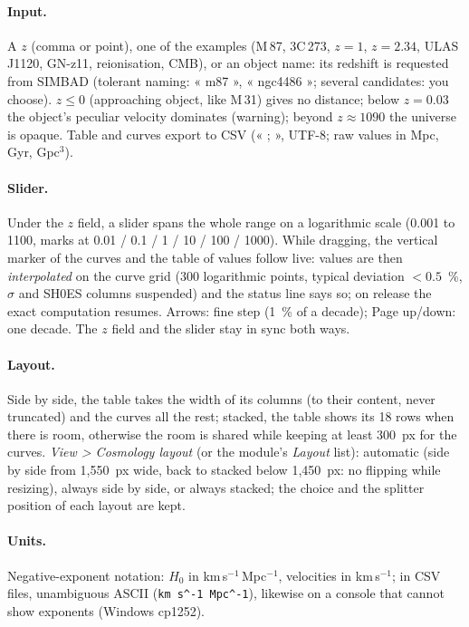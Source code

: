 \paragraph{Input.} A $z$ (comma or point), one of the examples (M\,87, 3C\,273, $z = 1$, $z = 2.34$, ULAS J1120,
GN-z11, reionisation, CMB), or an object name: its redshift is requested from SIMBAD (tolerant naming: « m87 »,
« ngc4486 »; several candidates: you choose). $z \le 0$ (approaching object, like M\,31) gives no distance; below
$z = 0.03$ the object's peculiar velocity dominates (warning); beyond $z \approx 1090$ the universe is opaque. Table
and curves export to CSV (« ; », UTF-8; raw values in Mpc, Gyr, Gpc$^3$).

\paragraph{Slider.} Under the $z$ field, a slider spans the whole range on a logarithmic scale (0.001 to 1100,
marks at 0.01 / 0.1 / 1 / 10 / 100 / 1000). While dragging, the vertical marker of the curves and the table of values
follow live: values are then \emph{interpolated} on the curve grid (300 logarithmic points, typical deviation
$< 0.5$~\%, $\sigma$ and SH0ES columns suspended) and the status line says so; on release the exact computation
resumes. Arrows: fine step (1~\% of a decade); Page up/down: one decade. The $z$ field and the slider stay in sync
both ways.

\paragraph{Layout.} Side by side, the table takes the width of its columns (to their content, never truncated) and
the curves all the rest; stacked, the table shows its 18 rows when there is room, otherwise the room is shared while
keeping at least 300~px for the curves. \emph{View > Cosmology layout} (or the module's \emph{Layout} list):
automatic (side by side from 1,550~px wide, back to stacked below 1,450~px: no flipping while resizing), always side
by side, or always stacked; the choice and the splitter position of each layout are kept.

\paragraph{Units.} Negative-exponent notation: $H_0$ in km\,s$^{-1}$\,Mpc$^{-1}$, velocities in km\,s$^{-1}$; in
CSV files, unambiguous ASCII (\texttt{km s\^{}-1 Mpc\^{}-1}), likewise on a console that cannot show exponents
(Windows cp1252).


